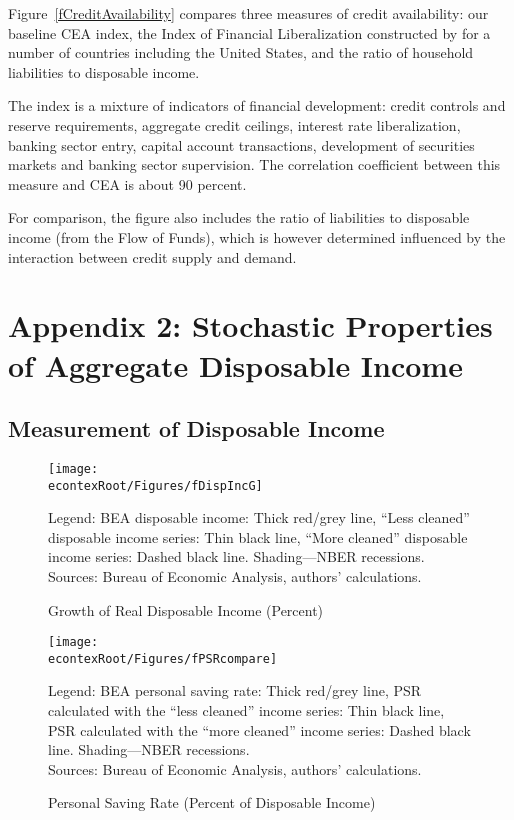 \documentclass[titlepage]{\econtex}
\begin{document}
Figure~\ref{fCreditAvailability} compares three measures of credit availability: our baseline CEA index, the Index of Financial Liberalization constructed by \cite{abiadEtAl_FinReforms} for a number of countries including the United States, and the ratio of household liabilities to disposable income.

The \citeauthor{abiadEtAl_FinReforms} index is a mixture of indicators of financial development: credit controls and reserve requirements, aggregate credit ceilings, interest rate liberalization, banking sector entry, capital account transactions, development of securities markets and banking sector supervision. The correlation coefficient between this measure and CEA is about 90 percent.

For comparison, the figure also includes the ratio of liabilities to disposable income (from the Flow of Funds), which is however determined influenced by the interaction between credit supply and demand.




\section*{Appendix 2: Stochastic Properties of Aggregate Disposable Income}

\subsection*{Measurement of Disposable Income}

\hypertarget{fDispIncG}{}
\begin{figure}
\caption{Growth of Real Disposable Income (Percent) \label{fDispIncG}}
\texttt{[image: \\econtexRoot/Figures/fDispIncG]}

\footnotesize
Legend: BEA disposable income: Thick red/grey line,  ``Less cleaned'' disposable income series: Thin black line, ``More cleaned'' disposable income series: Dashed black line. Shading---NBER recessions.\\[0mm]
\tiny Sources: Bureau of Economic Analysis, authors' calculations.
\end{figure}

\hypertarget{fPSRcompare}{}
\begin{figure}
\caption{Personal Saving Rate (Percent of Disposable Income) \label{fPSRcompare}}
\texttt{[image: \\econtexRoot/Figures/fPSRcompare]}

\footnotesize
Legend: BEA personal saving rate: Thick red/grey line, PSR calculated with the ``less cleaned'' income series: Thin black line, PSR calculated with the ``more cleaned'' income series: Dashed black line. Shading---NBER recessions.\\[0mm]
\tiny Sources: Bureau of Economic Analysis, authors' calculations.
\end{figure}
\end{document}
